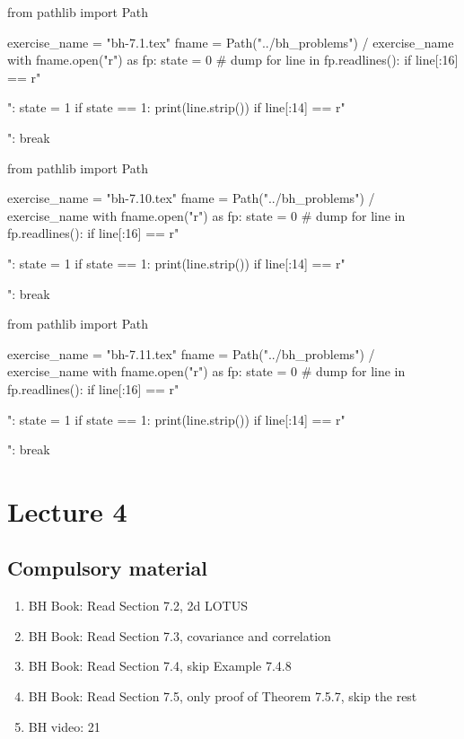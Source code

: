 \begin{pycode}
from pathlib import Path

exercise_name = "bh-7.1.tex"
fname = Path("../bh_problems") / exercise_name
with fname.open("r") as fp:
    state = 0  # dump
    for line in fp.readlines():
        if line[:16] == r"\begin{exercise}":
            state = 1
        if state == 1:
            print(line.strip())
        if line[:14] == r"\end{exercise}":
            break
\end{pycode}

\begin{pycode}
from pathlib import Path

exercise_name = "bh-7.10.tex"
fname = Path("../bh_problems") / exercise_name
with fname.open("r") as fp:
    state = 0  # dump
    for line in fp.readlines():
        if line[:16] == r"\begin{exercise}":
            state = 1
        if state == 1:
            print(line.strip())
        if line[:14] == r"\end{exercise}":
            break
\end{pycode}


\begin{pycode}
from pathlib import Path

exercise_name = "bh-7.11.tex"
fname = Path("../bh_problems") / exercise_name
with fname.open("r") as fp:
    state = 0  # dump
    for line in fp.readlines():
        if line[:16] == r"\begin{exercise}":
            state = 1
        if state == 1:
            print(line.strip())
        if line[:14] == r"\end{exercise}":
            break
\end{pycode}

\section{Lecture 4}

\subsection{Compulsory material}

\begin{enumerate}
\item BH Book: Read Section 7.2, 2d LOTUS
\item BH Book: Read Section 7.3, covariance and correlation
\item BH Book: Read Section 7.4, skip Example 7.4.8
\item BH Book: Read Section 7.5, only proof of Theorem 7.5.7, skip the rest
\item BH video: 21
\end{enumerate}



